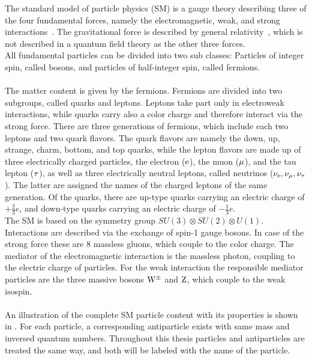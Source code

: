 The standard model of particle physics (SM) is a gauge theory describing three of the four fundamental forces, namely the electromagnetic, weak, and strong interactions~\cite{SM}. The gravitational force is described by general relativity~\cite{Einstein}, which is not described in a quantum field theory as the other three forces.\\
All fundamental particles can be divided into two sub classes: Particles of integer spin, called bosons, and particles of half-integer spin, called fermions.\\\\
The matter content is given by the fermions. Fermions are divided into two subgroups, called quarks and leptons. Leptons take part only in electroweak interactions, while quarks carry also a color charge and therefore interact via the strong force. There are three generations of fermions, which include each two leptons and two quark flavors. The quark flavors are namely the down, up, strange, charm, bottom, and top quarks, while the lepton flavors are made up of three electrically charged particles, the electron ($\mathrm{e}$), the muon ($\mu$), and the tau lepton ($\tau$), as well as three electrically neutral leptons, called neutrinos ($\nu_\mathrm{{e}},\nu_{\mu},\nu_{\tau}$). The latter are assigned the names of the charged leptons of the same generation. Of the quarks, there are up-type quarks carrying an electric charge of $+\frac{2}{3}e$, and down-type quarks carrying an electric charge of $-\frac{1}{3}e$.\\
The SM is based on the symmetry group $SU(3)\otimes SU(2)\otimes U(1)$. Interactions are described via the exchange of spin-1 gauge bosons. In case of the strong force these are 8 massless gluons, which couple to the color charge. The mediator of the electromagnetic interaction is the massless photon, coupling to the electric charge of particles. For the weak interaction the responsible mediator particles are the three massive bosons $\mathrm{W}^\pm$ and $\mathrm{Z}$, which couple to the weak isospin.\\\\
An illustration of the complete SM particle content with its properties is shown in .
For each particle, a corresponding antiparticle exists with same mass and inversed quantum numbers. Throughout this thesis particles and antiparticles are treated the same way, and both will be labeled with the name of the particle.\\

